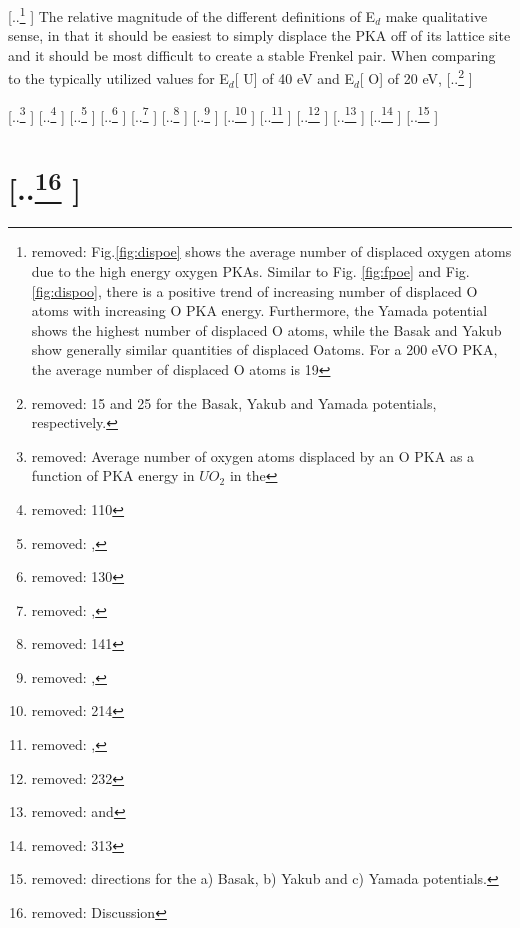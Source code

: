 \documentclass[review]{elsarticle} %
\providecommand{\DIFaddtex}[1]{{\protect\color{blue} \sf #1}} %
\providecommand{\DIFdeltex}[1]{{\protect\color{red} [..\footnote{removed: #1} ]}} %
\providecommand{\DIFaddbegin}{} %
\providecommand{\DIFaddend}{} %
\providecommand{\DIFdelbegin}{} %
\providecommand{\DIFdelend}{} %
\providecommand{\DIFdelFL}[1]{\DIFdel{#1}} %
\providecommand{\DIFadd}[1]{\texorpdfstring{\DIFaddtex{#1}}{#1}} %
\providecommand{\DIFdel}[1]{\texorpdfstring{\DIFdeltex{#1}}{}} %
\newcommand{\DIFscaledelfig}{0.5}
\newlength{\DIFdelgraphicswidth} %
\newlength{\DIFdelgraphicsheight} %
\newcommand{\DIFaddincludegraphics}[2][]{{\color{blue}\fbox{\DIFOincludegraphics[#1]{#2}}}} %
\newcommand{\DIFdelincludegraphics}[2][]{%
\sbox{\DIFdelgraphicsbox}{\DIFOincludegraphics[#1]{#2}}%
\settoboxwidth{\DIFdelgraphicswidth}{\DIFdelgraphicsbox} %
\settoboxtotalheight{\DIFdelgraphicsheight}{\DIFdelgraphicsbox} %
\scalebox{\DIFscaledelfig}{%
\parbox[b]{\DIFdelgraphicswidth}{\usebox{\DIFdelgraphicsbox}\\[-\baselineskip] \rule{\DIFdelgraphicswidth}{0em}}\llap{\resizebox{\DIFdelgraphicswidth}{\DIFdelgraphicsheight}{%
\setlength{\unitlength}{\DIFdelgraphicswidth}%
\begin{picture}(1,1)%
\thicklines\linethickness{2pt} %
{\color[rgb]{1,0,0}\put(0,0){\framebox(1,1){}}}%
{\color[rgb]{1,0,0}\put(0,0){\line( 1,1){1}}}%
{\color[rgb]{1,0,0}\put(0,1){\line(1,-1){1}}}%
\end{picture}%
}\hspace*{3pt}}} %
} %
\DeclareRobustCommand{\DIFaddbegin}{\DIFOaddbegin \let\includegraphics\DIFaddincludegraphics} %
\DeclareRobustCommand{\DIFaddend}{\DIFOaddend \let\includegraphics\DIFOincludegraphics} %
\DeclareRobustCommand{\DIFdelbegin}{\DIFOdelbegin \let\includegraphics\DIFdelincludegraphics} %
\DeclareRobustCommand{\DIFdelend}{\DIFOaddend \let\includegraphics\DIFOincludegraphics} %
\begin{document}
\DIFdelbegin \DIFdel{Fig.\ref{fig:dispoe} shows the average number of displaced oxygen atoms due to the high energy oxygen PKAs. Similar to Fig. \ref{fig:fpoe} and Fig. \ref{fig:dispoo}, there is a positive trend of increasing number of displaced O atoms with increasing O PKA energy. Furthermore, the Yamada potential shows the highest number of displaced O atoms, while the Basak and Yakub show generally similar quantities of displaced Oatoms. For a 200 eVO PKA, the average number of displaced O atoms is 19}\DIFdelend \DIFaddbegin \DIFadd{The relative magnitude of the different definitions of E$_d$ make qualitative sense, in that it should be easiest to simply displace the PKA off of its lattice site and it should be most difficult to create a stable Frenkel pair. When comparing to the typically utilized values for E$_d$}[\DIFadd{U}] \DIFadd{of 40 eV and E$_d$}[\DIFadd{O}] \DIFadd{of 20 eV}\DIFaddend , \DIFdelbegin \DIFdel{15 and 25 for the Basak, Yakub and Yamada potentials, respectively.
}%

{%
\DIFdelFL{Average number of oxygen atoms displaced by an O PKA as a function of PKA energy in $UO_2$ in the }%
\DIFdelFL{110}%
\DIFdelFL{, }%
\DIFdelFL{130}%
\DIFdelFL{, }%
\DIFdelFL{141}%
\DIFdelFL{, }%
\DIFdelFL{214}%
\DIFdelFL{, }%
\DIFdelFL{232}%
\DIFdelFL{and }%
\DIFdelFL{313}%
\DIFdelFL{directions for the a) Basak, b) Yakub and c) Yamada potentials.  }}

\section{\DIFdel{Discussion}}
\addtocounter{section}{-1}%
\end{document}
